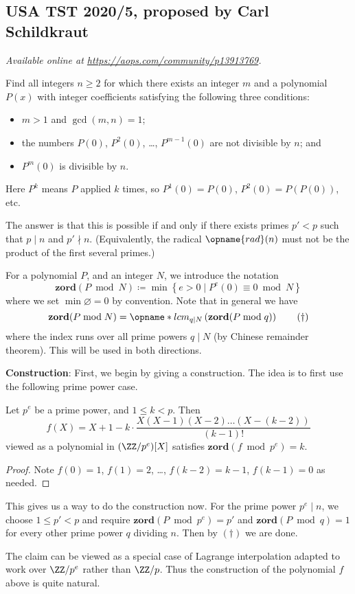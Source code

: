 \documentclass[11pt]{scrartcl}
\begin{document}
\subsection{USA TST 2020/5, proposed by Carl Schildkraut}
\textsl{Available online at \url{https://aops.com/community/p13913769}.}
\begin{mdframed}[style=mdpurplebox,frametitle={Problem statement}]
Find all integers $n \ge 2$ for which there exists an integer $m$ and
a polynomial $P(x)$ with integer coefficients satisfying the following three conditions:
\begin{itemize}
  \item $m > 1$ and $\gcd(m,n) = 1$;
  \item the numbers $P(0)$, $P^2(0)$, \dots, $P^{m-1}(0)$ are not divisible by $n$; and
  \item $P^m(0)$ is divisible by $n$.
\end{itemize}
Here $P^k$ means $P$ applied $k$ times, so $P^1(0) = P(0)$, $P^2(0) = P(P(0))$, etc.
\end{mdframed}
The answer is that this is possible if and only if
there exists primes $p' < p$ such that $p \mid n$ and $p' \nmid n$.
(Equivalently, the radical $\opname{rad}(n)$
must not be the product of the first several primes.)

For a polynomial $P$, and an integer $N$, we introduce the notation
\[ \mathbf{zord}(P \bmod N)
  \coloneqq \min \left\{ e > 0 \mid P^e(0) \equiv 0 \bmod N \right\} \]
where we set $\min\varnothing=0$ by convention.
Note that in general we have
\[ \mathbf{zord}(P \bmod N) = \opname*{lcm}_{q \mid N}
  \left( \mathbf{zord}(P \bmod q)  \right) \qquad (\dagger) \]
where the index runs over all prime powers
$q \mid N$ (by Chinese remainder theorem).
This will be used in both directions.

\textbf{Construction}:
First, we begin by giving a construction.
The idea is to first use the following prime power case.
\begin{claim*}
  Let $p^e$ be a prime power, and $1 \le k < p$.
  Then
  \[ f(X) = X+1 - k \cdot \frac{X(X-1)(X-2) \dots (X-(k-2))}{(k-1)!} \]
  viewed as a polynomial in $(\ZZ/p^e)[X]$ satisfies $\mathbf{zord}(f \bmod{p^e}) = k$.
\end{claim*}
\begin{proof}
  Note $f(0) = 1$, $f(1) = 2$, \dots, $f(k-2) = k-1$, $f(k-1) = 0$ as needed.
\end{proof}
This gives us a way to do the construction now.
For the prime power $p^e \mid n$, we choose $1 \le p' < p$ and require
$\mathbf{zord}(P \bmod{p^e}) = p'$ and
$\mathbf{zord}(P \bmod{q}) = 1$ for every other prime power $q$ dividing $n$.
Then by $(\dagger)$ we are done.
\begin{remark*}
  The claim can be viewed as a special case of Lagrange interpolation
  adapted to work over $\ZZ/p^e$ rather than $\ZZ/p$.
  Thus the construction of the polynomial $f$ above is quite natural.
\end{remark*}
\end{document}
